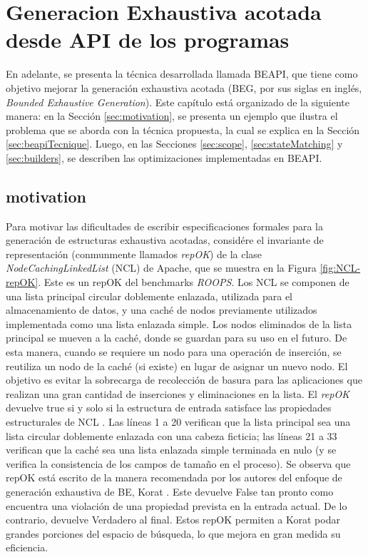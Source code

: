 \chapter{Generacion Exhaustiva acotada desde API de los programas}


\label{cap:beapi}

En adelante, se presenta la técnica  desarrollada llamada BEAPI, que tiene como objetivo mejorar la generación exhaustiva acotada (BEG, por sus siglas en inglés, \emph{Bounded Exhaustive Generation}). Este capítulo está organizado de la siguiente manera: en la Sección \ref{sec:motivation}, se presenta un ejemplo que ilustra el problema que se aborda con la técnica propuesta, la cual se explica en la Sección \ref{sec:beapiTecnique}. Luego, en las Secciones \ref{sec:scope}, \ref{sec:stateMatching} y \ref{sec:builders}, se describen las optimizaciones implementadas en BEAPI.


\section[Motivation]{motivation}
\label{sec:motivating-example}

Para motivar las dificultades de escribir especificaciones formales para la generación de estructuras exhaustiva acotadas,  considére el invariante de representación (conmunmente llamados \emph{repOK}) de la clase \emph{NodeCachingLinkedList} (NCL) de Apache, que se muestra en la Figura \ref{fig:NCL-repOK}. Este es un repOK del benchmarks \emph{ROOPS}. Los NCL se componen de una lista principal circular doblemente enlazada, utilizada para el almacenamiento de datos, y una caché de nodos previamente utilizados implementada como una lista enlazada simple. Los nodos eliminados de la lista principal se mueven a la caché, donde se guardan para su uso en el futuro. De esta manera, cuando se requiere un nodo para una operación de inserción, se reutiliza un nodo de la caché (si existe) en lugar de asignar un nuevo nodo. El objetivo es evitar la sobrecarga de recolección de basura para las aplicaciones que realizan una gran cantidad de inserciones y eliminaciones en la lista. El \emph{repOK} devuelve true si y solo si la estructura de entrada satisface las propiedades estructurales de NCL \cite{Liskov00}. Las líneas 1 a 20 verifican que la lista principal sea una lista circular doblemente enlazada con una cabeza ficticia; las líneas 21 a 33 verifican que la caché sea una lista enlazada simple terminada en nulo (y se verifica la consistencia de los campos de tamaño en el proceso). Se observa que repOK está escrito de la manera recomendada por los autores del enfoque de generación exhaustiva de BE, \textsf{Korat} \cite{Boyapati02}. Este devuelve False tan pronto como encuentra una violación de una propiedad prevista en la entrada actual. De lo contrario, devuelve Verdadero al final. Estos repOK permiten a \textsf{Korat} podar grandes porciones del espacio de búsqueda, lo que mejora en gran medida su eficiencia.


